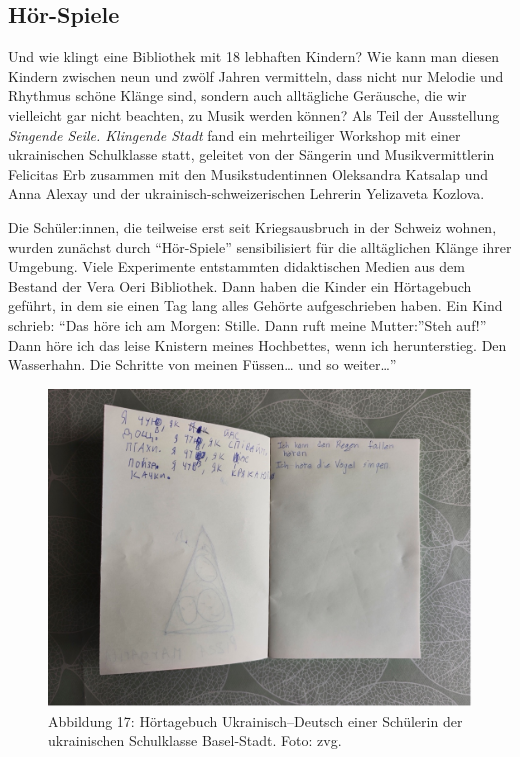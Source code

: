 \documentclass[a4paper,
fontsize=11pt,
oneside,
numbers=noperiodatend,
parskip=half-,
bibliography=totoc,
final
]{scrartcl}
\begin{document}
\hypertarget{huxf6r-spiele}{%
\subsection{Hör-Spiele}\label{huxf6r-spiele}}

Und wie klingt eine Bibliothek mit 18 lebhaften Kindern? Wie kann man
diesen Kindern zwischen neun und zwölf Jahren vermitteln, dass nicht nur
Melodie und Rhythmus schöne Klänge sind, sondern auch alltägliche
Geräusche, die wir vielleicht gar nicht beachten, zu Musik werden
können? Als Teil der Ausstellung \emph{Singende Seile. Klingende Stadt}
fand ein mehrteiliger Workshop mit einer ukrainischen Schulklasse statt,
geleitet von der Sängerin und Musikvermittlerin Felicitas Erb zusammen
mit den Musikstudentinnen Oleksandra Katsalap und Anna Alexay und der
ukrainisch-schweizerischen Lehrerin Yelizaveta Kozlova.

Die Schüler:innen, die teilweise erst seit Kriegsausbruch in der Schweiz
wohnen, wurden zunächst durch \enquote{Hör-Spiele} sensibilisiert für
die alltäglichen Klänge ihrer Umgebung. Viele Experimente entstammten
didaktischen Medien aus dem Bestand der Vera Oeri Bibliothek. Dann haben
die Kinder ein Hörtagebuch geführt, in dem sie einen Tag lang alles
Gehörte aufgeschrieben haben. Ein Kind schrieb: \enquote{Das höre ich am
Morgen: Stille. Dann ruft meine Mutter:}Steh auf!'' Dann höre ich das
leise Knistern meines Hochbettes, wenn ich herunterstieg. Den
Wasserhahn. Die Schritte von meinen Füssen\ldots{} und so weiter\ldots''

\begin{figure}
\centering
\includegraphics{img/Abb17.jpg}
\caption{Abbildung 17: Hörtagebuch Ukrainisch--Deutsch einer Schülerin der
ukrainischen Schulklasse Basel-Stadt. Foto: zvg.}
\end{figure}
\end{document}
